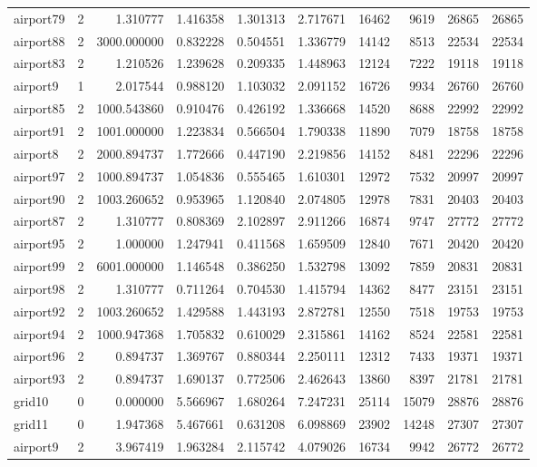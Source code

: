 \begin{longtable}{|l|r|r|r|r|r|r|r|r|r|}
airport79 & 2 & 1.310777 & 1.416358 & 1.301313 & 2.717671 & 16462 & 9619 & 26865 & 26865 \\
airport88 & 2 & 3000.000000 & 0.832228 & 0.504551 & 1.336779 & 14142 & 8513 & 22534 & 22534 \\
airport83 & 2 & 1.210526 & 1.239628 & 0.209335 & 1.448963 & 12124 & 7222 & 19118 & 19118 \\
airport9 & 1 & 2.017544 & 0.988120 & 1.103032 & 2.091152 & 16726 & 9934 & 26760 & 26760 \\
airport85 & 2 & 1000.543860 & 0.910476 & 0.426192 & 1.336668 & 14520 & 8688 & 22992 & 22992 \\
airport91 & 2 & 1001.000000 & 1.223834 & 0.566504 & 1.790338 & 11890 & 7079 & 18758 & 18758 \\
airport8 & 2 & 2000.894737 & 1.772666 & 0.447190 & 2.219856 & 14152 & 8481 & 22296 & 22296 \\
airport97 & 2 & 1000.894737 & 1.054836 & 0.555465 & 1.610301 & 12972 & 7532 & 20997 & 20997 \\
airport90 & 2 & 1003.260652 & 0.953965 & 1.120840 & 2.074805 & 12978 & 7831 & 20403 & 20403 \\
airport87 & 2 & 1.310777 & 0.808369 & 2.102897 & 2.911266 & 16874 & 9747 & 27772 & 27772 \\
airport95 & 2 & 1.000000 & 1.247941 & 0.411568 & 1.659509 & 12840 & 7671 & 20420 & 20420 \\
airport99 & 2 & 6001.000000 & 1.146548 & 0.386250 & 1.532798 & 13092 & 7859 & 20831 & 20831 \\
airport98 & 2 & 1.310777 & 0.711264 & 0.704530 & 1.415794 & 14362 & 8477 & 23151 & 23151 \\
airport92 & 2 & 1003.260652 & 1.429588 & 1.443193 & 2.872781 & 12550 & 7518 & 19753 & 19753 \\
airport94 & 2 & 1000.947368 & 1.705832 & 0.610029 & 2.315861 & 14162 & 8524 & 22581 & 22581 \\
airport96 & 2 & 0.894737 & 1.369767 & 0.880344 & 2.250111 & 12312 & 7433 & 19371 & 19371 \\
airport93 & 2 & 0.894737 & 1.690137 & 0.772506 & 2.462643 & 13860 & 8397 & 21781 & 21781 \\
grid10 & 0 & 0.000000 & 5.566967 & 1.680264 & 7.247231 & 25114 & 15079 & 28876 & 28876 \\
grid11 & 0 & 1.947368 & 5.467661 & 0.631208 & 6.098869 & 23902 & 14248 & 27307 & 27307 \\
airport9 & 2 & 3.967419 & 1.963284 & 2.115742 & 4.079026 & 16734 & 9942 & 26772 & 26772 \\

\end{longtable}
